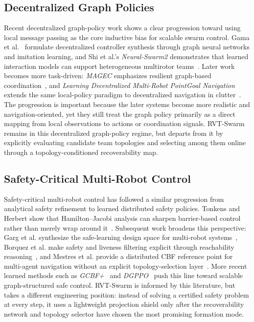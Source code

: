 \documentclass[journal]{IEEEtran}
\begin{document}
\subsection{Decentralized Graph Policies}
Recent decentralized graph-policy work shows a clear progression toward
using local message passing as the core inductive bias for scalable
swarm control. Gama et al.~\cite{gama2022gnn_synthesis} formulate
decentralized controller synthesis through graph neural networks and
imitation learning, and Shi et al.'s \emph{Neural-Swarm2} demonstrates
that learned interaction models can support heterogeneous multirotor
teams~\cite{shi2022neural_swarm2}. Later work becomes more task-driven:
\emph{MAGEC} emphasizes resilient graph-based coordination~\cite{goeckner2024magec},
and \emph{Learning Decentralized Multi-Robot PointGoal Navigation}
extends the same local-policy paradigm to decentralized navigation in
clutter~\cite{soualhi2025pointgoal}. The progression is important
because the later systems become more realistic and navigation-oriented,
yet they still treat the graph policy primarily as a direct mapping from
local observations to actions or coordination signals. RVT-Swarm
remains in this decentralized graph-policy regime, but departs from it
by explicitly evaluating candidate team topologies and selecting among
them online through a topology-conditioned recoverability map.

\subsection{Safety-Critical Multi-Robot Control}
Safety-critical multi-robot control has followed a similar progression
from analytical safety refinement to learned distributed safety
policies. Tonkens and Herbert show that Hamilton--Jacobi analysis can
sharpen barrier-based control rather than merely wrap around
it~\cite{tonkens2022refining_cbf_hj}. Subsequent work broadens this
perspective: Garg et al. synthesize the safe-learning design space for
multi-robot systems~\cite{garg2024safe_multirobot_review}, Borquez et
al. make safety and liveness filtering explicit through reachability
reasoning~\cite{borquez2024hj_filtering}, and Mestres et al. provide a
distributed CBF reference point for multi-agent navigation without an
explicit topology-selection layer~\cite{mestres2024distributed_safe_navigation}.
More recent learned methods such as \emph{GCBF+}~\cite{zhang2025gcbf_plus}
and \emph{DGPPO}~\cite{zhang2025dgppo} push this line toward scalable
graph-structured safe control. RVT-Swarm is informed by this literature,
but takes a different engineering position: instead of solving a
certified safety problem at every step, it uses a lightweight
projection shield only after the recoverability network and topology
selector have chosen the most promising formation mode.
\end{document}
